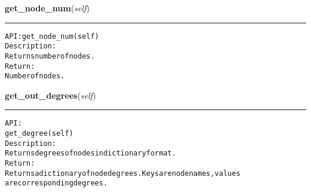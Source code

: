     \vspace{0.5ex}

\hspace{.8\funcindent}\begin{boxedminipage}{\funcwidth}

    \raggedright \textbf{get\_node\_num}(\textit{self})

    \vspace{-1.5ex}

    \rule{\textwidth}{0.5\fboxrule}
\setlength{\parskip}{2ex}
\begin{alltt}

API: get\_node\_num(self)
Description:
Returns number of nodes.
Return:
    Number of nodes.
\end{alltt}

\setlength{\parskip}{1ex}
    \end{boxedminipage}

    \label{coinor:gimpy:graph:Graph:get_out_degrees}

    \vspace{0.5ex}

\hspace{.8\funcindent}\begin{boxedminipage}{\funcwidth}

    \raggedright \textbf{get\_out\_degrees}(\textit{self})

    \vspace{-1.5ex}

    \rule{\textwidth}{0.5\fboxrule}
\setlength{\parskip}{2ex}
\begin{alltt}

API:
    get\_degree(self)
Description:
    Returns degrees of nodes in dictionary format.
Return:
    Returns a dictionary of node degrees. Keys are node names, values
    are corresponding degrees.
\end{alltt}

\setlength{\parskip}{1ex}
    \end{boxedminipage}

    \label{coinor:gimpy:graph:Graph:get_out_neighbors}

